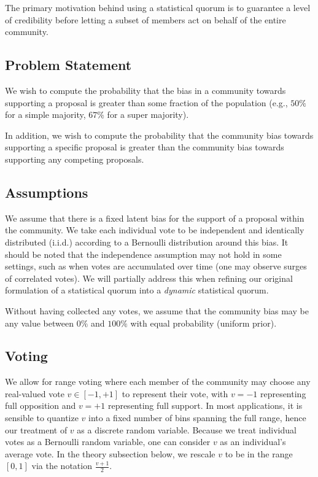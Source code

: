 \documentclass[chi_draft]{sigchi}
\begin{document}
The primary motivation behind using a statistical quorum is to guarantee a level of credibility before letting a subset of members act on behalf of the entire community.

\subsection{Problem Statement}
We wish to compute the probability that the bias in a community towards supporting a proposal is greater than some
fraction of the population (e.g., $50\%$ for a simple majority, $67\%$ for a super majority).

In addition, we wish to compute the probability that the community bias towards supporting a specific proposal is greater than the community bias towards supporting any competing proposals.

\subsection{Assumptions}
We assume that there is a fixed latent bias for the support of a proposal within the community.  We take each individual vote to be independent and identically distributed (i.i.d.) according to a Bernoulli distribution around this bias.  It should be noted that the independence assumption may not hold in some settings, such as when votes are accumulated over time (one may observe surges of correlated votes).  We will partially address this when refining our original formulation of a statistical quorum into a \textit{dynamic} statistical quorum.

Without having collected any votes, we assume that the community bias may be any value between $0\%$ and $100\%$ with equal probability (uniform prior).

\subsection{Voting}
We allow for range voting where each member of the community may choose any real-valued vote $v \in [-1,+1]$ to
represent their vote, with $v = -1$ representing full opposition and $v=+1$ representing full support.  In most applications, it is sensible to quantize $v$ into a fixed number of bins spanning the full range, hence our treatment of $v$ as a discrete random variable.  Because we treat individual votes as a Bernoulli random variable, one can consider $v$ as an individual's average vote.  In the theory subsection below, we rescale $v$ to be in the range $[0,1]$ via the notation $\frac{v + 1}{2}$.
\end{document}
